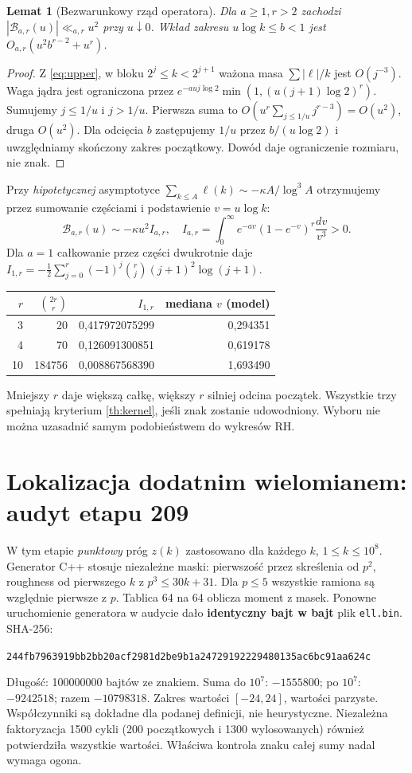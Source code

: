 \documentclass[11pt,a4paper]{article}
\newtheorem{lem}[tw]{Lemat}
\theoremstyle{definition}\newtheorem{defn}[tw]{Definicja}
\theoremstyle{remark}\newtheorem*{uw}{Uwaga}
\newcommand{\B}{\mathcal B}
\begin{document}
\begin{lem}[Bezwarunkowy rząd operatora]
Dla $a\ge1,r>2$ zachodzi $|\B_{a,r}(u)|\ll_{a,r}u^2$ przy $u\downarrow0$.
Wkład zakresu $u\log k\le b<1$ jest $O_{a,r}(u^2b^{r-2}+u^r)$.
\end{lem}
\begin{proof}
Z \eqref{eq:upper}, w bloku $2^j\le k<2^{j+1}$ ważona masa $\sum|\ell|/k$
jest $O(j^{-3})$. Waga jądra jest ograniczona przez
$e^{-a u j\log2}\min(1,(u(j+1)\log2)^r)$. Sumujemy $j\le1/u$ i $j>1/u$.
Pierwsza suma to $O(u^r\sum_{j\le1/u}j^{r-3})=O(u^2)$, druga $O(u^2)$.
Dla odcięcia $b$ zastępujemy $1/u$ przez $b/(u\log2)$ i uwzględniamy
skończony zakres początkowy. Dowód daje ograniczenie rozmiaru, nie znak.
\end{proof}
Przy \emph{hipotetycznej} asymptotyce
$\sum_{k\le A}\ell(k)\sim-\kappa A/\log^3 A$ otrzymujemy przez sumowanie
częściami i podstawienie $v=u\log k$:
\[
 \B_{a,r}(u)\sim-\kappa u^2 I_{a,r},\quad
 I_{a,r}=\int_0^\infty e^{-av}(1-e^{-v})^r\frac{dv}{v^3}>0.
\]
Dla $a=1$ całkowanie przez części dwukrotnie daje
$I_{1,r}=-\frac12\sum_{j=0}^r(-1)^j\binom rj(j+1)^2\log(j+1)$.
\begin{center}
\begin{tabular}{rrrr}
\toprule $r$&$\binom{2r}r$&$I_{1,r}$&mediana $v$ (model)\\\midrule
3&20&0,417972075299&0,294351\\4&70&0,126091300851&0,619178\\
10&184756&0,008867568390&1,693490\\\bottomrule
\end{tabular}
\end{center}
Mniejszy $r$ daje większą całkę, większy $r$ silniej odcina początek.
Wszystkie trzy spełniają kryterium \ref{th:kernel}, jeśli znak zostanie
udowodniony. Wyboru nie można uzasadnić samym podobieństwem do wykresów RH.

\section{Lokalizacja dodatnim wielomianem: audyt etapu 209}\label{sec:cert}
W tym etapie \emph{punktowy} próg $z(k)$ zastosowano dla każdego $k$,
$1\le k\le10^8$. Generator C++ stosuje niezależne maski: pierwszość
przez skreślenia od $p^2$, roughness od pierwszego $k$ z $p^3\le30k+31$.
Dla $p\le5$ wszystkie ramiona są względnie pierwsze z $p$. Tablica 64 na 64
oblicza moment z masek. Ponowne uruchomienie generatora w audycie dało
\textbf{identyczny bajt w bajt} plik \texttt{ell.bin}. SHA-256:
\begin{center}\small\texttt{244fb7963919bb2bb20acf2981d2be9b1a24729192229480135ac6bc91aa624c}\end{center}
Długość: 100000000 bajtów ze znakiem. Suma do $10^7$: $-1555800$;
po $10^7$: $-9242518$; razem $-10798318$. Zakres wartości $[-24,24]$,
wartości parzyste. Współczynniki są dokładne dla podanej definicji, nie
heurystyczne. Niezależna faktoryzacja 1500 cykli (200 początkowych i 1300 wylosowanych) również potwierdziła wszystkie wartości. Właściwa kontrola znaku całej sumy nadal wymaga ogona.
\end{document}
